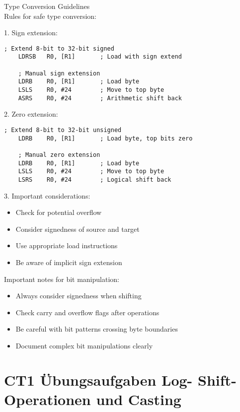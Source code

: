 \begin{KR}{Type Conversion Guidelines}\\
Rules for safe type conversion:

1. Sign extension:
\begin{lstlisting}[language=armasm, style=basesmol]
    ; Extend 8-bit to 32-bit signed
    LDRSB   R0, [R1]       ; Load with sign extend
    
    ; Manual sign extension
    LDRB    R0, [R1]       ; Load byte
    LSLS    R0, #24        ; Move to top byte
    ASRS    R0, #24        ; Arithmetic shift back
\end{lstlisting}

2. Zero extension:
\begin{lstlisting}[language=armasm, style=basesmol]
    ; Extend 8-bit to 32-bit unsigned
    LDRB    R0, [R1]       ; Load byte, top bits zero
    
    ; Manual zero extension
    LDRB    R0, [R1]       ; Load byte
    LSLS    R0, #24        ; Move to top byte
    LSRS    R0, #24        ; Logical shift back
\end{lstlisting}

3. Important considerations:
\begin{itemize}
  \item Check for potential overflow
  \item Consider signedness of source and target
  \item Use appropriate load instructions
  \item Be aware of implicit sign extension
\end{itemize}
\end{KR}

\begin{remark}
Important notes for bit manipulation:
\begin{itemize}
  \item Always consider signedness when shifting
  \item Check carry and overflow flags after operations
  \item Be careful with bit patterns crossing byte boundaries
  \item Document complex bit manipulations clearly
\end{itemize}
\end{remark}

\section*{CT1 Übungsaufgaben Log- Shift-Operationen und Casting}
